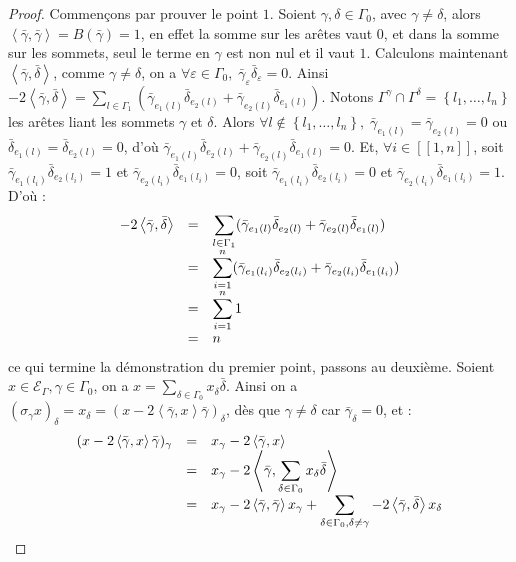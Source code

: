 \documentclass[a4paper,10pt]{article}
\newcommand{\ps}[2]{\left\langle#1,#2\right\rangle}
\newcommand{\EG}{\mathscr{E}_\Gamma}
\newcommand{\ent}[2]{[\![#1,#2]\!]}
\newcommand{\dps}{\displaystyle}
\begin{document}
		\begin{proof}
			Commençons par prouver le point $1$. Soient $\gamma,\delta\in\Gamma_0$, avec $\gamma\neq\delta$, alors $\ps{\bar\gamma}{\bar\gamma}=B(\bar\gamma)=1$, en effet la somme sur les arêtes vaut 0, et dans la somme sur les sommets, seul le terme en $\gamma$ est non nul et il vaut $1$. Calculons maintenant $\ps{\bar\gamma}{\bar\delta}$, comme $\gamma\neq\delta$, on a $\forall\varepsilon\in\Gamma_0,\;\bar\gamma_\varepsilon\bar\delta_\varepsilon=0$. Ainsi $-2\ps{\bar\gamma}{\bar\delta}=\sum_{l\in\Gamma_1}(\bar\gamma_{e_1(l)}\bar\delta_{e_2(l)}+\bar\gamma_{e_2(l)}\bar\delta_{e_1(l)})$. Notons $\Gamma^\gamma\cap\Gamma^\delta=\left\{ l_1,\dots,l_n \right\}$ les arêtes liant les sommets $\gamma$ et $\delta$. Alors $\forall l\notin\left\{ l_1,\dots,l_n \right\},\;\bar\gamma_{e_1(l)}=\bar\gamma_{e_2(l)}=0$ ou $\bar\delta_{e_1(l)}=\bar\delta_{e_2(l)}=0$, d'où $\bar\gamma_{e_1(l)}\bar\delta_{e_2(l)}+\bar\gamma_{e_2(l)}\bar\delta_{e_1(l)}=0$. Et, $\forall i \in\ent{1}{n}$, soit $\bar\gamma_{e_1(l_i)}\bar\delta_{e_2(l_i)}=1$ et $\bar\gamma_{e_2(l_i)}\bar\delta_{e_1(l_i)}=0$, soit $\bar\gamma_{e_1(l_i)}\bar\delta_{e_2(l_i)}=0$ et $\bar\gamma_{e_2(l_i)}\bar\delta_{e_1(l_i)}=1$. D'où :
			\[
		\begin{array}{>{\dps}r>{\dps}l>{\dps}l}
			-2\ps{\bar\gamma}{\bar\delta}&=& \sum_{l\in\Gamma_1}(\bar\gamma_{e_1(l)}\bar\delta_{e_2(l)}+\bar\gamma_{e_2(l)}\bar\delta_{e_1(l)})\\
			&=& \sum_{i=1}^n(\bar\gamma_{e_1(l_i)}\bar\delta_{e_2(l_i)}+\bar\gamma_{e_2(l_i)}\bar\delta_{e_1(l_i)})\\
			&=& \sum_{i=1}^n 1\\
			&=& n
		\end{array}
			\]
			ce qui termine la démonstration du premier point, passons au deuxième. Soient $x\in\EG,\gamma\in\Gamma_0$, on a $x=\sum_{\delta\in\Gamma_0}x_\delta\bar\delta$. Ainsi on a $(\sigma_\gamma x)_\delta=x_\delta=(x-2\ps{\bar\gamma}{x}\bar\gamma)_\delta$, dès que $\gamma\neq\delta$ car $\bar\gamma_\delta=0$, et :
			\[
		\begin{array}{>{\dps}r>{\dps}l>{\dps}l}
			(x-2\ps{\bar\gamma}{x}\bar\gamma)_{\gamma}&=& x_\gamma-2\ps{\bar\gamma}{x}\\
			&=& x_\gamma-2\ps{\bar\gamma}{\sum_{\delta\in\Gamma_0}x_\delta\bar\delta}\\
			&=& x_\gamma-2\ps{\bar\gamma}{\bar\gamma}x_\gamma+\sum_{\delta\in\Gamma_0,\delta\neq\gamma}-2\ps{\bar\gamma}{\bar\delta}x_\delta\\

\end{array}\]
\end{proof}
\end{document}
